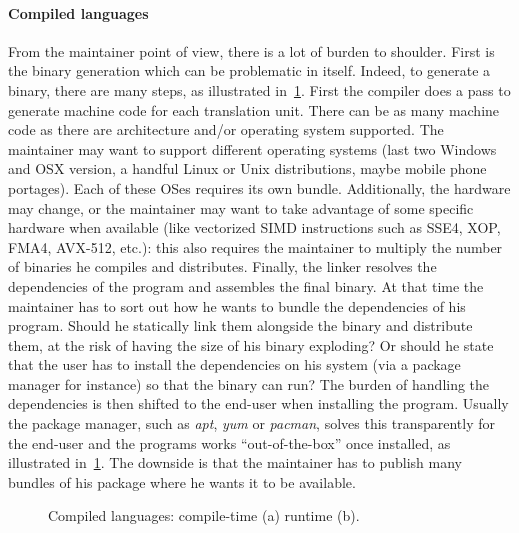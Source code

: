 \paragraph{Compiled languages} From the maintainer point of view, there is a lot of burden to shoulder. First is the
binary generation which can be problematic in itself. Indeed, to generate a binary, there are many steps, as illustrated
in~\cref{fig:static.dynamic.compiled}. First the compiler does a pass to generate machine code for each translation
unit. There can be as many machine code as there are architecture and/or operating system supported. The maintainer may
want to support different operating systems (last two Windows and OSX version, a handful Linux or Unix distributions,
maybe mobile phone portages). Each of these OSes requires its own bundle. Additionally, the hardware may change, or the
maintainer may want to take advantage of some specific hardware when available (like vectorized SIMD instructions such
as SSE4, XOP, FMA4, AVX-512, etc.): this also requires the maintainer to multiply the number of binaries he compiles and
distributes. Finally, the linker resolves the dependencies of the program and assembles the final binary. At that time
the maintainer has to sort out how he wants to bundle the dependencies of his program. Should he statically link them
alongside the binary and distribute them, at the risk of having the size of his binary exploding? Or should he state
that the user has to install the dependencies on his system (via a package manager for instance) so that the binary can
run? The burden of handling the dependencies is then shifted to the end-user when installing the program. Usually the
package manager, such as \emph{apt}, \emph{yum} or \emph{pacman}, solves this transparently for the end-user and the
programs works ``out-of-the-box'' once installed, as illustrated in~\cref{fig:static.dynamic.compiled}. The downside is
that the maintainer has to publish many bundles of his package where he wants it to be available.

\begin{figure}[htbp]
  \centering
  \hfil
  \caption{Compiled languages: compile-time (a) \vs runtime (b).}
  \label{fig:static.dynamic.compiled}
\end{figure}

